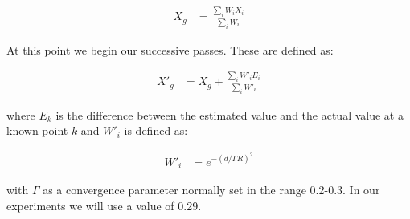             \begin{align*}
                X_{g} &= \frac{\sum_{i}{W_{i}X_{i}}}{\sum_{i}{W_{i}}}
            \end{align*}

            At this point we begin our successive passes. These are defined as:

            \begin{align*}
                X'_{g} &= X_{g} + \frac{\sum_{i}{W'_{i}E_{i}}}{\sum_{i}{W'_{i}}}
            \end{align*}

            where $E_{k}$ is the difference between the estimated value and the actual value at a known point $k$ and $W'_{i}$ is defined as:

            \begin{align*}
                W'_{i} &= e^{-(d/\Gamma R)^{2}}
            \end{align*}

            with $\Gamma$ as a convergence parameter normally set in the range 0.2-0.3. In our experiments we will use a value of 0.29.


